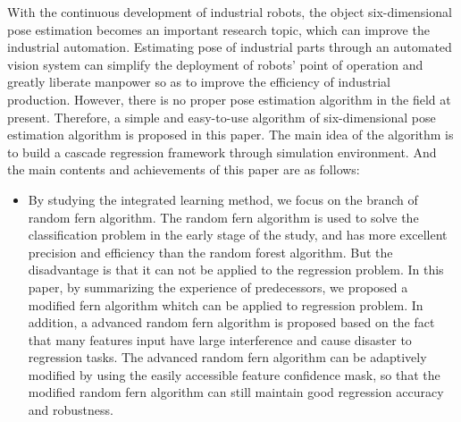 \begin{englishabstract}

With the continuous development of industrial robots, the object six-dimensional pose estimation becomes an important research topic, which can improve the industrial automation. Estimating pose of industrial parts through an automated vision system can simplify the deployment of robots' point of operation and greatly liberate manpower so as to improve the efficiency of industrial production. However, there is no proper pose estimation algorithm in the field at present. Therefore, a simple and easy-to-use algorithm of six-dimensional pose estimation algorithm is proposed in this paper. The main idea of the algorithm is to build a cascade regression framework through simulation environment. And the main contents and achievements of this paper are as follows:




\begin{itemize}
\item By studying the integrated learning method, we focus on the branch of random fern algorithm. The random fern algorithm is used to solve the classification problem in the early stage of the study, and has more excellent precision and efficiency than the random forest algorithm. But the disadvantage is that it can not be applied to the regression problem. In this paper, by summarizing the experience of predecessors, we proposed a modified fern algorithm whitch can be applied to regression problem. In addition, a advanced random fern algorithm is proposed based on the fact that many features input have large interference and cause disaster to regression tasks. The advanced random fern algorithm can be adaptively modified by using the easily accessible feature confidence mask, so that the modified random fern algorithm can still maintain good regression accuracy and robustness.


\end{itemize}
\end{englishabstract}
